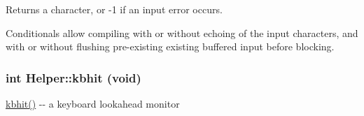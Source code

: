 Returns a character, or -\/1 if an input error occurs.

Conditionals allow compiling with or without echoing of the input characters, and with or without flushing pre-\/existing existing buffered input before blocking. \hypertarget{classHelper_a5e455435fde35e17e92eb5c86da160d5}{
\subsubsection[{kbhit}]{\setlength{\rightskip}{0pt plus 5cm}int Helper::kbhit (void)}}
\label{classHelper_a5e455435fde35e17e92eb5c86da160d5}
\hyperlink{classHelper_a5e455435fde35e17e92eb5c86da160d5}{kbhit()} -\/-\/ a keyboard lookahead monitor

